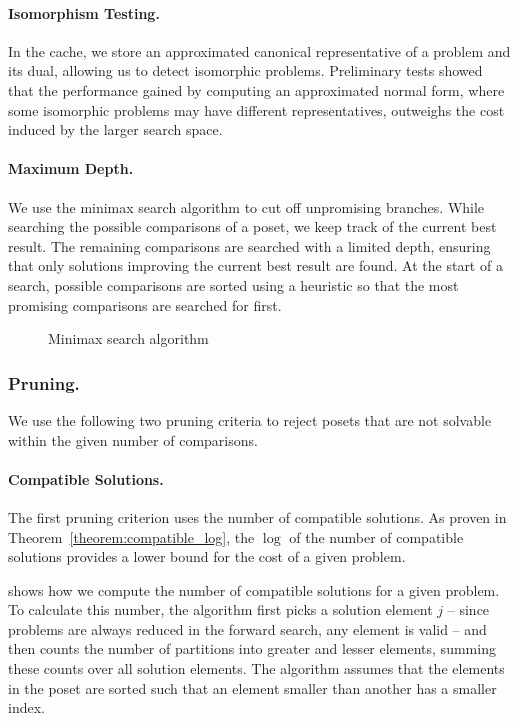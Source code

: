 \documentclass[twoside,leqno,twocolumn]{article}
\begin{document}
\paragraph{Isomorphism Testing.}
In the cache, we store an approximated canonical representative of a problem and its dual, allowing us to detect isomorphic problems.
Preliminary tests showed that the performance gained by computing an approximated normal form, where some isomorphic problems may have different representatives, outweighs the cost induced by the larger search space.

\paragraph{Maximum Depth.}
We use the minimax search algorithm to cut off unpromising branches.
While searching the possible comparisons of a poset, we keep track of the current best result.
The remaining comparisons are searched with a limited depth, ensuring that only solutions improving the current best result are found.
At the start of a search, possible comparisons are sorted using a heuristic so that the most promising comparisons are searched for first.

\begin{figure}[!b]
  \centering
  
  \caption{Minimax search algorithm}
  \label{fig:minimax_search}
\end{figure}

\subsubsection{Pruning.}
We use the following two pruning criteria to reject posets that are not solvable within the given number of comparisons.

\paragraph{Compatible Solutions.}
The first pruning criterion uses the number of compatible solutions.
As proven in Theorem~\ref{theorem:compatible_log}, the $\log$ of the number of compatible solutions provides a lower bound for the cost of a given problem.

 shows how we compute the number of compatible solutions for a given problem.
To calculate this number, the algorithm first picks a solution element $j$ -- since problems are always reduced in the forward search, any element is valid -- and then counts the number of partitions into greater and lesser elements, summing these counts over all solution elements.
The algorithm assumes that the elements in the poset are sorted such that an element smaller than another has a smaller index.
\end{document}
